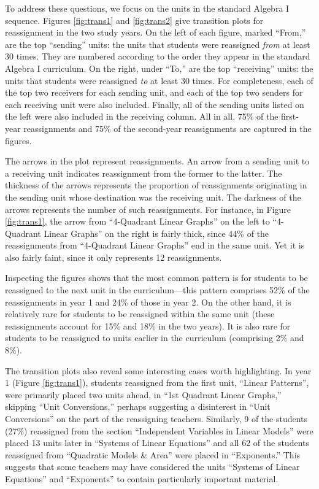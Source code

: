 \documentclass[notitlepage,12pt]{jedm}\usepackage[]{graphicx}\usepackage[]{color}
\begin{document}
To address these questions, we focus on the units in the standard
Algebra I sequence.
Figures \ref{fig:trans1} and \ref{fig:trans2} give transition plots
for reassignment in the two study years.
On the left of each figure, marked ``From,'' are the top ``sending''
units: the units that students were reassigned \emph{from} at least 30
times.
They are numbered according to the order they appear in the standard Algebra I curriculum.
On the right, under ``To,'' are the top ``receiving'' units: the units
that students were reassigned \emph{to} at least 30 times.
For completeness, each of the top two receivers for each sending unit,
and each of the top two senders for each receiving unit were also included.
Finally, all of the sending units listed on the left were also included in the
receiving column.
All in all, 75\% of the first-year reassignments and
75\% of the second-year reassignments are
captured in the figures.

The arrows in the plot represent reassignments.
An arrow from a sending unit to a receiving unit indicates
reassignment from the former to the latter.
The thickness of the arrows represents the proportion of reassignments
originating in the sending unit whose destination was the receiving unit.
The darkness of the arrows represents the number of such reassignments.
For instance, in Figure \ref{fig:trans1}, the arrow from
``4-Quadrant Linear Graphs'' on the left to ``4-Quadrant Linear
Graphs'' on the right is fairly thick, since
44\%
of the reassignments from ``4-Quadrant Linear Graphs'' end in the
same unit.
Yet it is also fairly faint, since it only represents
12
reassignments.

Inspecting the figures shows that the most common pattern is for
students to be reassigned to the next unit in the curriculum---this pattern comprises
52\% of the reassignments in year 1 and
24\% of those in
year 2.
On the other hand, it is relatively rare for students to be reassigned within the same unit
(these reassignments account for 15\% and 18\% in the two years).
It is also rare for students to be reassigned to units earlier in the curriculum (comprising
2\% and
8\%).

The transition plots also reveal some interesting cases worth highlighting.
In year 1 (Figure \ref{fig:trans1}), students reassigned from the first unit, ``Linear Patterns'', were primarily placed two units ahead, in ``1st Quadrant Linear Graphs,'' skipping ``Unit Conversions,'' perhaps suggesting a disinterest in ``Unit Conversions'' on the part of the reassigning teachers.
Similarly,
9
of the students
(27\%)
reassigned from the section ``Independent Variables in Linear Models'' were placed 13 units later in ``Systems of Linear Equations''
and all 62 of the students reassigned from ``Quadratic Models \& Area'' were placed in ``Exponents.''
This suggests that some teachers may have considered the units ``Systems of Linear Equations'' and ``Exponents'' to contain particularly important material.
\end{document}
